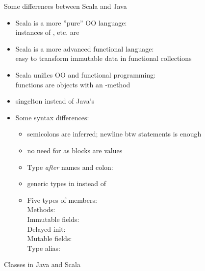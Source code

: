 \documentclass{lecturenotes}
\begin{document}
\begin{Slide}{Some differences between Scala and Java}\footnotesize
\begin{itemize}
\item Scala is a more ''pure'' OO language: \\ instances of , etc. are 
\item Scala is a more advanced functional language: \\ easy to transform immutable data in functional collections
\item Scala unifies OO and functional programming: \\ functions are objects with an -method
\item singelton  instead of Java's 

\item Some syntax differences: \pause
\begin{itemize}\fontsize{8}{9}\selectfont
\item semicolons are inferred; newline btw statements is enough
\item no need for  as blocks are values
\item Type \emph{after} names and colon: 
\item generic types in \code{[T]} instead of 
\item Five types of members: 
\\ Methods: 
\\ Immutable fields: 
\\  Delayed init: 
\\  Mutable fields: 
\\  Type alias: 
\end{itemize}


\end{itemize}

\end{Slide}

\begin{Slide}{Classes in Java and Scala}
\vspace{-1.5em}
\begin{multicols}{2}


\columnbreak

\pause


\pause


\end{multicols}

\end{Slide}
\end{document}
